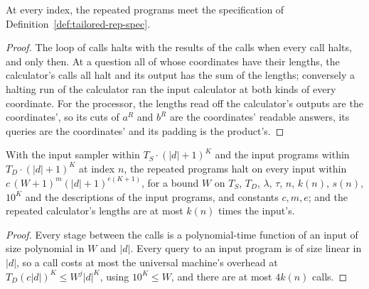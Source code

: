 \begin{lemma}
\label{lem:tailored-rep-programs}
\leanok
At every index, the repeated programs meet the specification of
Definition~\ref{def:tailored-rep-spec}.
\end{lemma}

\begin{proof}
\leanok
The loop of calls halts with the results of the calls when every call halts, and only then. At
a question all of whose coordinates have their lengths, the calculator's calls all halt and its
output has the sum of the lengths; conversely a halting run of the calculator ran the input
calculator at both kinds of every coordinate. For the processor, the lengths read off the
calculator's outputs are the coordinates', so its cuts of $a^R$ and $b^R$ are the coordinates'
readable answers, its queries are the coordinates' and its padding is the product's.
\end{proof}

\begin{lemma}
\label{lem:tailored-rep-programs-time}
\leanok
With the input sampler within $T_S \cdot (|d| + 1)^K$ and the input programs within
$T_D \cdot (|d| + 1)^K$ at index $n$, the repeated programs halt on every input within
$c\,(W + 1)^m (|d| + 1)^{e (K + 1)}$, for a bound $W$ on $T_S$, $T_D$, $\lambda$, $\tau$, $n$,
$k(n)$, $s(n)$, $10^K$ and the descriptions of the input programs, and constants $c, m, e$; and
the repeated calculator's lengths are at most $k(n)$ times the input's.
\end{lemma}

\begin{proof}
\leanok
Every stage between the calls is a polynomial-time function of an input of size polynomial in
$W$ and $|d|$. Every query to an input program is of size linear in $|d|$, so a call costs at
most the universal machine's overhead at $T_D (c|d|)^K \le W^{j} |d|^K$, using $10^K \le W$, and
there are at most $4k(n)$ calls.
\end{proof}

